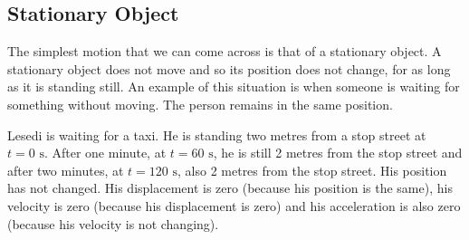             \subsection*{Stationary Object}
            \nopagebreak
        \label{m38795*id69015}The simplest motion that we can come across is that of a stationary object. A stationary object does not move and so its position does not change, for as long as it is standing still.
An example of this situation is when someone is waiting for something without moving.
The person remains in the same position.\par 
        \label{m38795*id69021}Lesedi is waiting for a taxi. He is standing two metres from a stop street at $t = 0 \text{ s}$. After one minute, at $t = 60 \text{ s}$, he is still 2 metres from the stop street and after two minutes, at $t = 120 \text{ s}$, also 2 metres from the stop street. His position has not changed. His displacement is zero (because his position is the same), his velocity is zero (because his displacement is zero) and his acceleration is also zero (because his velocity is not changing).\par 
    \setcounter{subfigure}{0}
